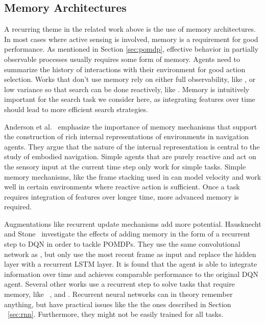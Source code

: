 
\subsection{Memory Architectures}

A recurring theme in the related work above is the use of memory architectures.
In most cases where active sensing is involved, memory is a requirement for good performance.
As mentioned in Section \ref{sec:pomdp}, effective behavior in partially observable processes usually requires some form of memory.
Agents need to summarize the history of interactions with their environment for good action selection.
Works that don't use memory rely on either full observability, like \cite{caicedo_active_2015}, or low variance so that search can be done reactively, like \cite{ghesu_artificial_2016}.
Memory is intuitively important for the search task we consider here, as integrating features over time should lead to more efficient search strategies.

Anderson et al.~\cite{anderson_evaluation_2018} emphasize the importance of memory mechanisms that support the construction of rich internal representations of environments in navigation agents.
They argue that the nature of the internal representation is central to the study of embodied navigation.
Simple agents that are purely reactive and act on the sensory input at the current time step only work for simple tasks.
Simple memory mechanisms, like the frame stacking used in \cite{mnih_human_2015} can model velocity and work well in certain environments where reactive action is sufficient.
Once a task requires integration of features over longer time, more advanced memory is required.

Augmentations like recurrent update mechanisms add more potential.
Hausknecht and Stone~\cite{hausknecht_stone_2017} investigate the effects of adding memory in the form of a recurrent step to DQN in order to tackle POMDPs.
They use the same convolutional network as \cite{mnih_human_2015}, but only use the most recent frame as input and replace the hidden layer with a recurrent LSTM layer.
It is found that the agent is able to integrate information over time and achieves comparable performance to the original DQN agent.
Several other works use a recurrent step to solve tasks that require memory, like ~\cite{mnih_attention_2014}, and \cite{mnih_asynchronous_2016}.
Recurrent neural networks can in theory remember anything, but have practical issues like the the ones described in Section ~\ref{sec:rnn}.
Furthermore, they might not be easily trained for all tasks.


